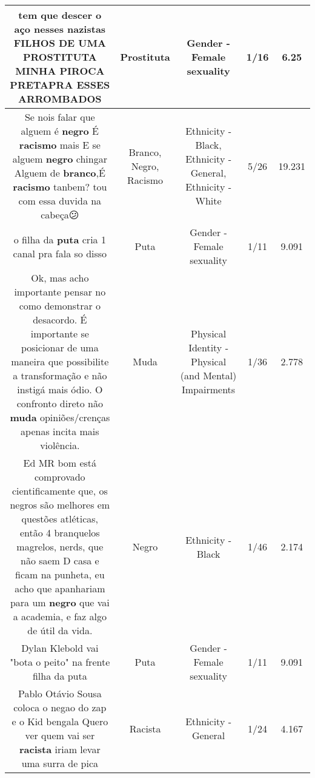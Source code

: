 \documentclass[11pt]{article}
\newlength\mylength
\begin{document}
\begin{center}
\begin{longtable}{|C{.65\mylength}|C{.30\mylength}|C{.12\mylength}|C{.12\mylength}|C{.12\mylength}|}
  \small tem que descer o aço nesses nazistas FILHOS DE UMA \textbf{PROSTITUTA} MINHA PIROCA PRETAPRA ESSES ARROMBADOS\normalsize   & Prostituta & Gender - Female sexuality & 1/16 & 6.25 \\  \hline
  \small Se nois falar que alguem é \textbf{negro} É \textbf{racismo} mais E se alguem \textbf{negro} chingar Alguem de \textbf{branco},É \textbf{racismo} tanbem? tou com essa duvida na cabeça😕\normalsize   & Branco, Negro, Racismo & Ethnicity - Black, Ethnicity - General, Ethnicity - White & 5/26 & 19.231 \\  \hline
  \small o filha da \textbf{puta} cria 1 canal pra fala so disso\normalsize   & Puta & Gender - Female sexuality & 1/11 & 9.091 \\  \hline
  \small Ok, mas acho importante pensar no como demonstrar o desacordo. É importante se posicionar de uma maneira que possibilite a transformação e não instigá mais ódio. O confronto direto não \textbf{muda} opiniões/crenças apenas incita mais violência.\normalsize   & Muda & Physical Identity - Physical (and Mental) Impairments & 1/36 & 2.778 \\  \hline
  \small Ed MR bom está comprovado cientificamente que, os negros são melhores em questões atléticas, então 4 branquelos magrelos, nerds, que não saem D casa e ficam na punheta, eu acho que apanhariam para um \textbf{negro} que vai a academia, e faz algo de útil da vida.\normalsize   & Negro & Ethnicity - Black & 1/46 & 2.174 \\  \hline
  \small Dylan Klebold vai "bota o peito" na frente filha da puta\normalsize   & Puta & Gender - Female sexuality & 1/11 & 9.091 \\  \hline
  \small Pablo Otávio Sousa coloca o negao do zap e o Kid bengala Quero ver quem vai ser \textbf{racista} iriam levar uma surra de pica\normalsize   & Racista & Ethnicity - General & 1/24 & 4.167 \\  \hline

\end{longtable}
\end{center}
\end{document}
